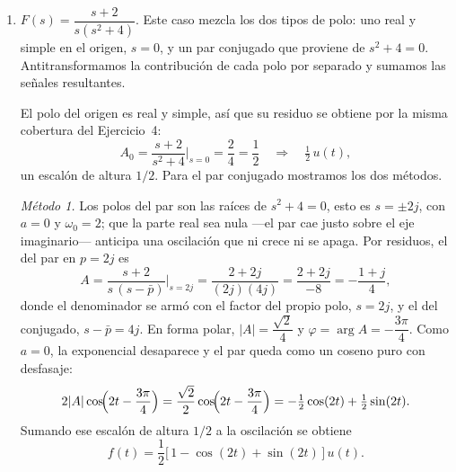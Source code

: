 \documentclass[10pt,a4paper]{article}
\begin{document}
\begin{enumerate}
	\emph{Método 2.} Las raíces del denominador son $-2\pm3j$, con $a=2$ y
	$\omega_0=3$, así que el par fija el denominador $(s+2)^2+3^2$ y la función
	racional es
	\[
		F(s)=\frac{5s-11}{(s+2)^2+3^2}.
	\]
	Para leerla en la tabla, el numerador debe tener la forma $B(s+2)+3C$. A
	diferencia del inciso anterior, el numerador $5s-11$ no está escrito así, y
	hay que acomodarlo: forzamos la aparición del bloque $(s+2)$ y dejamos el
	resto como término constante,
	\[
		5s-11=5(s+2)-10-11=5(s+2)-21=5(s+2)+3(-7),
	\]
	donde el $-21$ se escribió como $3\cdot(-7)$ para que la constante quede
	multiplicada por $\omega_0=3$, como pide la tabla. Con $B=5$ y $C=-7$, la
	función se separa en sus dos términos de tabla,
	\[
		F(s)=5\cdot\frac{s+2}{(s+2)^2+3^2}-7\cdot\frac{3}{(s+2)^2+3^2},
	\]
	y cada término se antitransforma por separado:
	\[
		f(t)=e^{-2t}\bigl[\,5\cos(3t)-7\sin(3t)\,\bigr]\,u(t).
	\]
	Es la misma señal que el Método~1 entregó como un solo coseno desfasado,
	ahora repartida entre coseno y seno. La equivalencia se comprueba sin
	recalcular: la parte real del residuo fija la amplitud del coseno y la
	imaginaria la del seno,
	\[
		2\operatorname{Re}\{A\}=5=B, \qquad -2\operatorname{Im}\{A\}=-7=C.
	\]

	\item $F(s)=\dfrac{s+2}{s(s^2+4)}$. Este caso mezcla los dos tipos de
	polo: uno real y simple en el origen, $s=0$, y un par conjugado que
	proviene de $s^2+4=0$. Antitransformamos la contribución de cada polo por
	separado y sumamos las señales resultantes.

	El polo del origen es real y simple, así que su residuo se obtiene por
	la misma cobertura del Ejercicio~4:
	\[
		A_0=\frac{s+2}{s^2+4}\bigg|_{s=0}=\frac24=\frac12
		\quad\Longrightarrow\quad \tfrac12\,u(t),
	\]
	un escalón de altura $1/2$. Para el par conjugado mostramos los dos métodos.

	\emph{Método 1.} Los polos del par son las raíces de $s^2+4=0$, esto es
	$s=\pm 2j$, con $a=0$ y $\omega_0=2$; que la parte real sea nula ---el par
	cae justo sobre el eje imaginario--- anticipa una oscilación que ni crece
	ni se apaga. Por residuos, el del par en $p=2j$ es
	\[
		A=\frac{s+2}{s\,(s-\bar p)}\bigg|_{s=2j}
		 =\frac{2+2j}{(2j)(4j)}
		 =\frac{2+2j}{-8}
		 =-\frac{1+j}{4},
	\]
	donde el denominador se armó con el factor del propio polo, $s=2j$, y el
	del conjugado, $s-\bar p=4j$. En forma polar, $|A|=\dfrac{\sqrt2}{4}$ y
	$\varphi=\arg A=-\dfrac{3\pi}{4}$. Como $a=0$, la exponencial desaparece y
	el par queda como un coseno puro con desfasaje:
	\[
		2|A|\cos\!\Bigl(2t-\frac{3\pi}{4}\Bigr)
		=\frac{\sqrt2}{2}\cos\!\Bigl(2t-\frac{3\pi}{4}\Bigr)
		=-\tfrac12\cos(2t)+\tfrac12\sin(2t).
	\]
	Sumando ese escalón de altura $1/2$ a la oscilación se obtiene
	\[
		f(t)=\frac12\bigl[\,1-\cos(2t)+\sin(2t)\,\bigr]\,u(t).
	\]


\end{enumerate}
\end{document}
